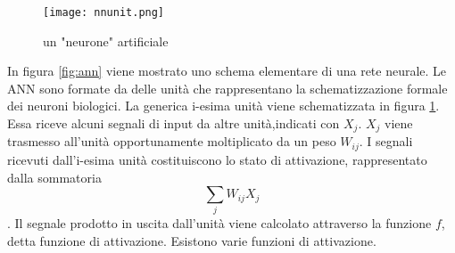 \begin{figure}
  \texttt{[image: nnunit.png]}
  \caption{un "neurone" artificiale \cite{unit}}
  \label{fig::unit}
\end{figure}
In figura \ref{fig:ann} viene mostrato uno schema elementare di una rete neurale. Le ANN sono formate da delle unità che rappresentano la schematizzazione formale
dei neuroni biologici.  La generica i-esima unità viene schematizzata in figura \ref{fig::unit}. Essa riceve alcuni segnali di input da altre unità,indicati con $X_j$. $X_j$ viene trasmesso all'unità opportunamente moltiplicato da un peso $W_{ij}$.
I segnali ricevuti dall'i-esima unità costituiscono lo stato di attivazione, rappresentato dalla sommatoria \[\sum_jW_{ij}X_j\]. Il segnale prodotto in uscita dall'unità viene calcolato attraverso la funzione $f$, detta funzione di attivazione. Esistono varie funzioni di attivazione.











    